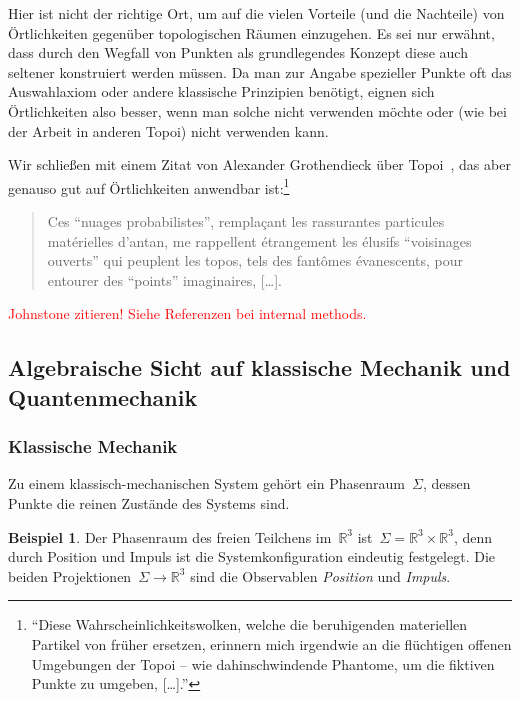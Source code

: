 \documentclass[a4paper,ngerman,12pt]{scrartcl}
\theoremstyle{definition}
\newtheorem{bsp}[defn]{Beispiel}
\theoremstyle{plain}
\theoremstyle{remark}
\newcommand{\RR}{\mathbb{R}}
\renewcommand{\_}{\mathpunct{.}\,}
\newcommand{\?}{\,{:}\,}
\newcommand{\XXX}[1]{\textcolor{red}{#1}}
\begin{document}
Hier ist nicht der richtige Ort, um auf die vielen Vorteile (und die Nachteile) von
Örtlichkeiten gegenüber topologischen Räumen einzugehen. Es sei nur erwähnt,
dass durch den Wegfall von Punkten als grundlegendes Konzept diese auch
seltener konstruiert werden müssen. Da man zur Angabe spezieller Punkte oft das
Auswahlaxiom oder andere klassische Prinzipien benötigt, eignen sich
Örtlichkeiten also besser, wenn man solche nicht verwenden möchte oder (wie bei
der Arbeit in anderen Topoi) nicht verwenden kann.

Wir schließen mit einem Zitat von Alexander Grothendieck über
Topoi~\cite{grothendieck:zitat}, das aber
genauso gut auf Örtlichkeiten anwendbar ist:\footnote{%
"`Diese \glq Wahrscheinlichkeitswolken\grq, welche die beruhigenden materiellen
Partikel von früher ersetzen, erinnern mich irgendwie an die flüchtigen
\glq offenen Umgebungen\grq{} der Topoi -- wie dahinschwindende Phantome, um
die fiktiven \glq Punkte\grq{} zu umgeben, [\ldots]."'}
\begin{quote}
Ces “nuages probabilistes”, remplaçant les rassurantes particules matérielles
d’antan, me rappellent étrangement les élusifs “voisinages ouverts” qui
peuplent les topos, tels des fantômes évanescents, pour entourer des “points”
imaginaires, [\ldots].
\end{quote}

\XXX{Johnstone zitieren! Siehe Referenzen bei internal methods.}


\subsection{Algebraische Sicht auf klassische Mechanik und Quantenmechanik}

\subsubsection*{Klassische Mechanik}

Zu einem klassisch-mechanischen System gehört ein Phasenraum~$\Sigma$, dessen
Punkte die reinen Zustände des Systems sind.

\begin{bsp}Der Phasenraum des freien Teilchens im~$\RR^3$ ist~$\Sigma = \RR^3
\times \RR^3$, denn durch Position und Impuls ist die Systemkonfiguration
eindeutig festgelegt. Die beiden Projektionen~$\Sigma \to \RR^3$ sind die
Observablen \emph{Position} und \emph{Impuls}.\end{bsp}
\end{document}
